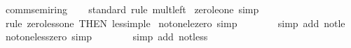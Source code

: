 \begin{isabellebody}
\endisatagproof
{\isafoldproof}%
%
\isadelimproof
\isanewline
%
\endisadelimproof
\isanewline
{}\isamarkupfalse%
\ comm{\isacharunderscore}{\kern0pt}semiring{\isacharunderscore}{\kern0pt}{}\isanewline
%
\isadelimproof
\ \ %
\endisadelimproof
%
\isatagproof
{}\isamarkupfalse%
\ standard\ {\isacharparenleft}{\kern0pt}rule\ mult{\isacharunderscore}{\kern0pt}{}{\isacharunderscore}{\kern0pt}left{\isacharparenright}{\kern0pt}%
\endisatagproof
{\isafoldproof}%
%
\isadelimproof
\isanewline
%
\endisadelimproof
\isanewline
{}\isamarkupfalse%
\ zero{\isacharunderscore}{\kern0pt}le{\isacharunderscore}{\kern0pt}one\ {\isacharbrackleft}{\kern0pt}simp{\isacharbrackright}{\kern0pt}{\isacharcolon}{\kern0pt}\ {\isachardoublequoteopen}{}\ {\isasymle}\ {}{\isachardoublequoteclose}\isanewline
%
\isadelimproof
\ \ %
\endisadelimproof
%
\isatagproof
{}\isamarkupfalse%
\ {\isacharparenleft}{\kern0pt}rule\ zero{\isacharunderscore}{\kern0pt}less{\isacharunderscore}{\kern0pt}one\ {\isacharbrackleft}{\kern0pt}THEN\ less{\isacharunderscore}{\kern0pt}imp{\isacharunderscore}{\kern0pt}le{\isacharbrackright}{\kern0pt}{\isacharparenright}{\kern0pt}%
\endisatagproof
{\isafoldproof}%
%
\isadelimproof
\isanewline
%
\endisadelimproof
\isanewline
{}\isamarkupfalse%
\ not{\isacharunderscore}{\kern0pt}one{\isacharunderscore}{\kern0pt}le{\isacharunderscore}{\kern0pt}zero\ {\isacharbrackleft}{\kern0pt}simp{\isacharbrackright}{\kern0pt}{\isacharcolon}{\kern0pt}\ {\isachardoublequoteopen}{\isasymnot}\ {}\ {\isasymle}\ {}{\isachardoublequoteclose}\isanewline
%
\isadelimproof
\ \ %
\endisadelimproof
%
\isatagproof
{}\isamarkupfalse%
\ {\isacharparenleft}{\kern0pt}simp\ add{\isacharcolon}{\kern0pt}\ not{\isacharunderscore}{\kern0pt}le{\isacharparenright}{\kern0pt}%
\endisatagproof
{\isafoldproof}%
%
\isadelimproof
\isanewline
%
\endisadelimproof
\isanewline
{}\isamarkupfalse%
\ not{\isacharunderscore}{\kern0pt}one{\isacharunderscore}{\kern0pt}less{\isacharunderscore}{\kern0pt}zero\ {\isacharbrackleft}{\kern0pt}simp{\isacharbrackright}{\kern0pt}{\isacharcolon}{\kern0pt}\ {\isachardoublequoteopen}{\isasymnot}\ {}\ {\isacharless}{\kern0pt}\ {}{\isachardoublequoteclose}\isanewline
%
\isadelimproof
\ \ %
\endisadelimproof
%
\isatagproof
{}\isamarkupfalse%
\ {\isacharparenleft}{\kern0pt}simp\ add{\isacharcolon}{\kern0pt}\ not{\isacharunderscore}{\kern0pt}less{\isacharparenright}{\kern0pt}%
\endisatagproof

\end{isabellebody}
